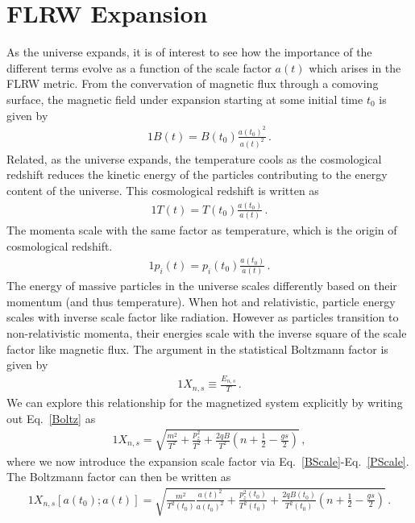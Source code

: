 \documentclass[
aps,
pra,
showpacs,
preprintnumbers,
amsmath,
amssymb,
footinbib
]{revtex4-2}
\newcommand*{\req}[1]{Eq.~{\eqref{#1}}}
\begin{document}
\section{FLRW Expansion}\label{sec:FLRW}
\noindent As the universe expands, it is of interest to see how the importance of the different terms evolve as a function of the scale factor $a(t)$ which arises in the FLRW metric. From the convervation of magnetic flux through a comoving surface, the magnetic field under expansion starting at some initial time $t_{0}$ is given by
\begin{alignat}{1}
    \label{BScale} B(t) = B(t_{0})\frac{a(t_{0})^{2}}{a(t)^{2}}\,.
\end{alignat}
Related, as the universe expands, the temperature cools as the cosmological redshift reduces the kinetic energy of the particles contributing to the energy content of the universe. This cosmological redshift is written as
\begin{alignat}{1}
    \label{TScale} T(t) = T(t_{0})\frac{a(t_{0})}{a(t)}\,.
\end{alignat}
The momenta scale with the same factor as temperature, which is the origin of cosmological redshift.
\begin{alignat}{1}
    \label{PScale} p_{i}(t) = p_{i}(t_{0})\frac{a(t_{0})}{a(t)}\,.
\end{alignat}
The energy of massive particles in the universe scales differently based on their momentum (and thus temperature). When hot and relativistic, particle energy scales with inverse scale factor like radiation. However as particles transition to non-relativistic momenta, their energies scale with the inverse square of the scale factor like magnetic flux. The argument in the statistical Boltzmann factor is given by
\begin{alignat}{1}
    \label{Boltz} X_{n,s}\equiv\frac{E_{n,s}}{T}\,.
\end{alignat}
We can explore this relationship for the magnetized system explicitly by writing out \req{Boltz} as
\begin{alignat}{1}
    \label{XExplicit} X_{n,s} = \sqrt{\frac{m^{2}}{T^{2}}+\frac{p_{z}^{2}}{T^{2}}+\frac{2qB}{T^{2}}\left(n+\frac{1}{2}-\frac{gs}{2}\right)}\,,
\end{alignat}
where we now introduce the expansion scale factor via \req{BScale}-\req{PScale}. The Boltzmann factor can then be written as
\begin{alignat}{1}
    \label{XScale} X_{n,s}\left[a(t_{0});a(t)\right] = \sqrt{\frac{m^{2}}{T^{2}(t_{0})}\frac{a(t)^{2}}{a(t_{0})^{2}}+\frac{p_{z}^{2}(t_{0})}{T^{2}(t_{0})}+\frac{2qB(t_{0})}{T^{2}(t_{0})}\left(n+\frac{1}{2}-\frac{gs}{2}\right)}\,.
\end{alignat}
\end{document}
